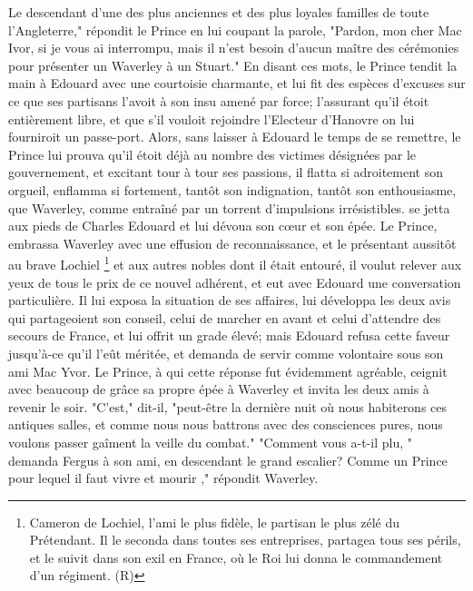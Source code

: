 {Le descendant d'une des plus anciennes et des plus loyales familles de toute l'Angleterre," répondit le Prince en lui coupant la parole, "Pardon, mon cher Mac Ivor, si je vous ai interrompu, mais il n'est besoin d'aucun maître des cérémonies pour présenter un Waverley à un Stuart."
En disant ces mots, le Prince tendit la main à Edouard avec une courtoisie charmante, et lui fit des espèces d'excuses sur ce que ses partisans l'avoit à son insu amené par force; l'assurant qu'il étoit entièrement libre, et que s'il vouloit rejoindre l'Electeur d'Hanovre on lui fourniroit un passe-port. Alors, sans laisser à Edouard le temps de se remettre, le Prince lui prouva qu'il étoit déjà au nombre des victimes désignées par le gouvernement, et excitant tour à tour ses passions, il flatta si adroitement son orgueil, enflamma si fortement, tantôt son indignation, tantôt son enthousiasme, que Waverley, comme entraîné par un torrent d'impulsions irrésistibles.\setcounter{page}{228} se jetta aux pieds de Charles Edouard et lui dévoua son cœur et son épée.
Le Prince, embrassa Waverley avec une effusion de reconnaissance, et le présentant aussitôt au brave Lochiel \footnote{Cameron de Lochiel, l'ami le plus fidèle, le partisan le plus zélé du Prétendant. Il le seconda dans toutes ses entreprises, partagea tous ses périls, et le suivit dans son exil en France, où le Roi lui donna le commandement d'un régiment. (R)} et aux autres nobles dont il était entouré, il voulut relever aux yeux de tous le prix de ce nouvel adhérent, et eut avec Edouard une conversation particulière. Il lui exposa la situation de ses affaires, lui développa les deux avis qui partageoient son conseil, celui de marcher en avant et celui d'attendre des secours de France, et lui offrit un grade élevé; mais Edouard refusa cette faveur jusqu'à-ce qu'il l'eût méritée, et demanda de servir comme volontaire sous son ami Mac Yvor. Le Prince, à qui cette réponse fut évidemment agréable, ceignit avec beaucoup de grâce sa propre épée à Waverley et invita les deux amis à revenir le soir. "C'est," dit-il, "peut-être la dernière nuit où nous habiterons ces antiques salles, et comme nous nous battrons avec des consciences pures, nous voulons passer gaîment la veille du combat."
"Comment vous a-t-il plu, " demanda Fergus à son ami, en descendant le grand escalier?\setcounter{page}{229} Comme un Prince pour lequel il faut vivre et mourir ," répondit Waverley.
}
